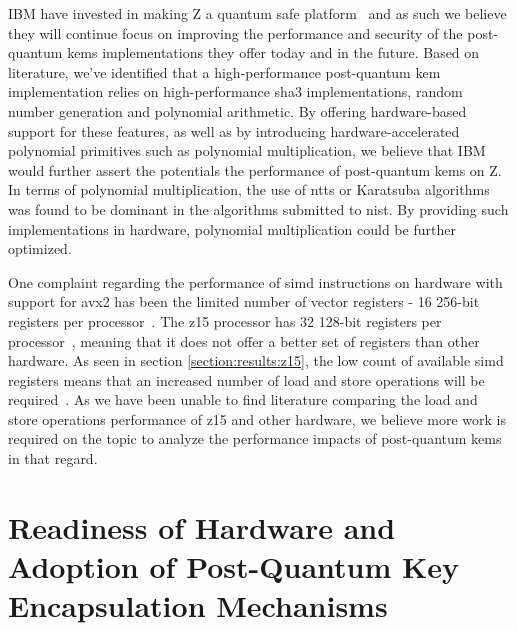 IBM have invested in making Z a quantum safe platform~\cite{ibm:z15:2019} and as such we believe they will continue focus on improving the performance and security of the \gls{post-quantum} \glspl{kem} implementations they offer today and in the future. Based on literature, we've identified that a high-performance \gls{post-quantum} \gls{kem} implementation relies on high-performance \gls{sha3} implementations, random number generation and polynomial arithmetic. By offering hardware-based support for these features, as well as by introducing hardware-accelerated polynomial primitives such as polynomial multiplication, we believe that IBM would further assert the potentials the performance of \gls{post-quantum} \glspl{kem} on Z. In terms of polynomial multiplication, the use of \glspl{ntt} or Karatsuba algorithms was found to be dominant in the algorithms submitted to \gls{nist}. By providing such implementations in hardware, polynomial multiplication could be further optimized.

One complaint regarding the performance of \gls{simd} instructions on hardware with support for \gls{avx2} has been the limited number of vector registers - 16 256-bit registers per processor~\cite{guneysu2013}. The \gls{z15} processor has 32 128-bit registers per processor~\cite{redbook:z15}, meaning that it does not offer a better set of registers than other hardware. As seen in section \ref{section:results:z15}, the low count of available \gls{simd} registers means that an increased number of load and store operations will be required~\cite{guneysu2013}. As we have been unable to find literature comparing the load and store operations performance of \gls{z15} and other hardware, we believe more work is required on the topic to analyze the performance impacts of \gls{post-quantum} \glspl{kem} in that regard.


\section{Readiness of Hardware and Adoption of Post-Quantum Key Encapsulation Mechanisms}

